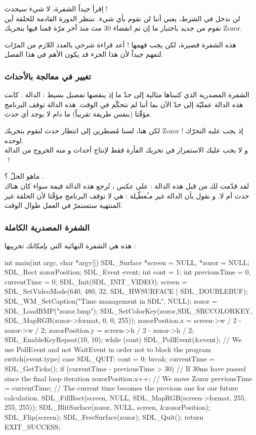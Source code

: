 اِقرأ جيداً الشفرة، لا شيء سيحدث !\\
لن ندخل في الشرط، يعني أننا لن نقوم بأي شيء. ننتظر الدورة القادمة للحلقة أين نقوم من جديد باختبار ما إن تم انقضاء 30 مث منذ آخر مرّة قمنا فيها بتحريك 
\textenglish{Zozor}.

هذه الشفرة قصيرة، لكن يجب فهمها ! أعد قراءة شرحي بالعدد اللازم من المرّات لتفهم جيداً لأن هذا الجزء قد يكون الأهم في هذا الفصل.

\subsubsection{تغيير في معالجة بالأحداث}

الشفرة المصدرية الذي كتبناها مثالية إلى حدّ ما إذ ينقصها تفصيل بسيط : الدالة 
.
كانت هذه الدالة عمليّة إلى حدّ الآن بما أننا لم نتحكّم في الوقت. هذه الدالة توقف البرنامج مؤقّتا (بنفس طريقة
تقريباً) ما دام لا يوجد أي حدث.

لكن هنا، لسنا مُضطرين إلى انتظار حدث لنقوم بتحريك
\textenglish{Zozor} !
إذ يجب عليه التحرّك لوحده.\\
و لا يجب عليك الاستمرار في تحريك الفأرة فقط لإنتاج أحداث و منه الخروج من الدالة 
~!

ماهو الحلّ ؟ 
.\\
لقد قدّمت لك من قبل هذه الدالة : على عكس
،
تُرجع هذه الدالة قيمة سواء كان هناك حدث أم لا. و نقول بأن الدالة غير مـُعطّـِلة : هي لا توقف البرنامج مؤقّتا لأن الحلقة غير المنتهية ستستمرّ في العمل طوال الوقت.

\subsubsection{الشفرة المصدرية الكاملة}

هذه هي الشفرة النهائية التي بإمكانك تجريبها :

\begin{Csource}
int main(int argc, char *argv[])
{
	SDL_Surface *screen = NULL, *zozor = NULL;
	SDL_Rect zozorPosition;
	SDL_Event event;
	int cont = 1;
	int previousTime = 0, currentTime = 0;
	SDL_Init(SDL_INIT_VIDEO);
	screen = SDL_SetVideoMode(640, 480, 32, SDL_HWSURFACE | SDL_DOUBLEBUF);
	SDL_WM_SetCaption("Time management in SDL", NULL);
	zozor = SDL_LoadBMP("zozor.bmp");
	SDL_SetColorKey(zozor,SDL_SRCCOLORKEY, SDL_MapRGB(zozor->format, 0, 0, 255));
	zozorPosition.x = screen->w / 2 - zozor->w / 2;
	zozorPosition.y = screen->h / 2 - zozor->h / 2;
	SDL_EnableKeyRepeat(10, 10);
	while (cont)
	{
		SDL_PollEvent(&event); // We use PollEvent and not WaitEvent in order not to block the program
		switch(event.type)
		{
			case SDL_QUIT:
			cont = 0;
			break;
		}
		currentTime = SDL_GetTicks();
		if (currentTime - previousTime > 30) // If 30ms have passed since the final loop iteration
		{
			zozorPosition.x++; // We move Zozor
			previousTime = currentTime; // The current time becomes the previous one for our future calculation.
		}
		SDL_FillRect(screen, NULL, SDL_MapRGB(screen->format, 255, 255, 255));
		SDL_BlitSurface(zozor, NULL, screen, &zozorPosition);
		SDL_Flip(screen);
	}
	SDL_FreeSurface(zozor);
	SDL_Quit();
	return EXIT_SUCCESS;
}
\end{Csource}

